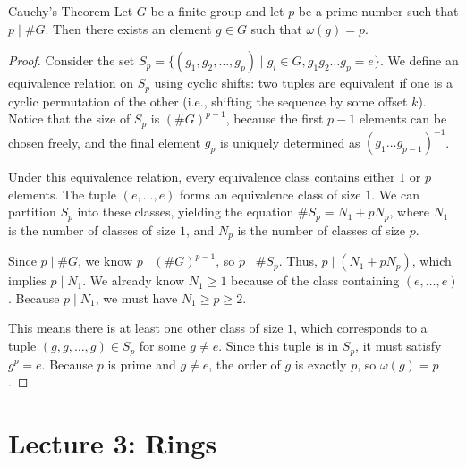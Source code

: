 \documentclass[11pt, a4paper]{article}
\begin{document}
\begin{theorem}{Cauchy's Theorem}{}
Let $G$ be a finite group and let $p$ be a prime number such that $p \mid \#G$. Then there exists an element $g \in G$ such that $\omega(g) = p$.
\end{theorem}
\begin{proof}
Consider the set $S_p = \{ (g_1, g_2, \dots, g_p) \mid g_i \in G, g_1 g_2 \dots g_p = e \}$. 
We define an equivalence relation on $S_p$ using cyclic shifts: two tuples are equivalent if one is a cyclic permutation of the other (i.e., shifting the sequence by some offset $k$).
Notice that the size of $S_p$ is $(\#G)^{p-1}$, because the first $p-1$ elements can be chosen freely, and the final element $g_p$ is uniquely determined as $(g_1 \dots g_{p-1})^{-1}$.

Under this equivalence relation, every equivalence class contains either $1$ or $p$ elements. The tuple $(e, \dots, e)$ forms an equivalence class of size $1$.
We can partition $S_p$ into these classes, yielding the equation $\#S_p = N_1 + p N_p$, where $N_1$ is the number of classes of size $1$, and $N_p$ is the number of classes of size $p$.

Since $p \mid \#G$, we know $p \mid (\#G)^{p-1}$, so $p \mid \#S_p$. Thus, $p \mid (N_1 + p N_p)$, which implies $p \mid N_1$.
We already know $N_1 \ge 1$ because of the class containing $(e, \dots, e)$. Because $p \mid N_1$, we must have $N_1 \ge p \ge 2$.

This means there is at least one other class of size $1$, which corresponds to a tuple $(g, g, \dots, g) \in S_p$ for some $g \neq e$. Since this tuple is in $S_p$, it must satisfy $g^p = e$. Because $p$ is prime and $g \neq e$, the order of $g$ is exactly $p$, so $\omega(g) = p$.
\end{proof}

\section{Lecture 3: Rings}
\end{document}
